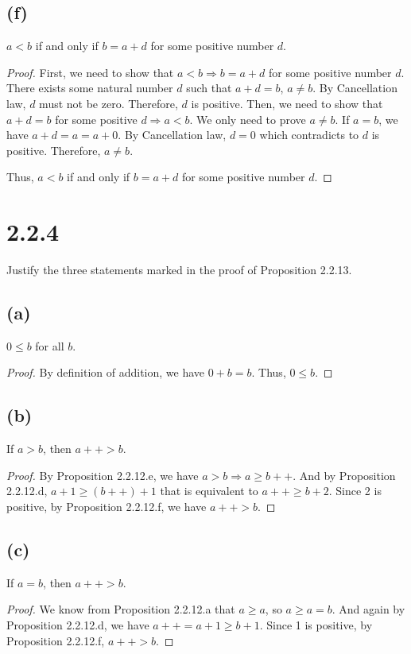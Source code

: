 \documentclass[12pt, letter]{article}
\begin{document}
\subsection*{(f)}
$a<b$ if and only if $b=a+d$ for some positive number $d$.
\begin{proof}
    First, we need to show that $a<b\Rightarrow b=a+d$ for some positive number $d$. There exists some natural number $d$ such that
    $a+d=b$, $a\ne b$. By Cancellation law, $d$ must not be zero. Therefore, $d$ is positive. Then, we need to show that $a+d=b$ for some positive $d\Rightarrow a<b$. We only need to prove $a\ne b$.
    If $a=b$, we have $a+d=a=a+0$. By Cancellation law, $d=0$ which contradicts to $d$ is positive. Therefore, $a\ne b$.
    
    Thus, $a<b$ if and only if $b=a+d$ for some positive number $d$.
\end{proof}
\section*{2.2.4}
Justify the three statements marked in the proof of Proposition 2.2.13. 
\subsection*{(a)}
$0\leq b$ for all $b$.
\begin{proof}
    By definition of addition, we have $0+b=b$. Thus, $0\leq b$.
\end{proof}
\subsection*{(b)}
If $a>b$, then $a++>b$.
\begin{proof}
    By Proposition 2.2.12.e, we have $a>b\Rightarrow a\geq b++$. And by Proposition 2.2.12.d, $a+1\geq (b++)+1$ that is equivalent to 
    $a++\geq b+2$. Since 2 is positive, by Proposition 2.2.12.f, we have $a++>b$. 
\end{proof}
\subsection*{(c)}
If $a=b$, then $a++>b$.
\begin{proof}
    We know from Proposition 2.2.12.a that $a\geq a$, so $a\geq a=b$. And again by Proposition 2.2.12.d, we have $a++=a+1\geq b+1$. Since 1 is positive, 
    by Proposition 2.2.12.f, $a++>b$.

\end{proof}
\end{document}
